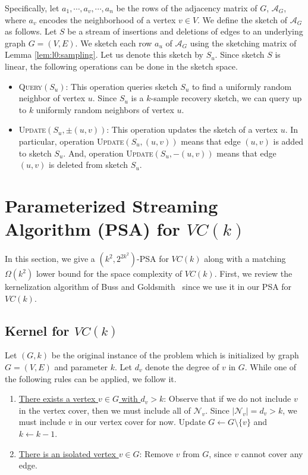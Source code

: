 \documentclass[11pt,letter]{article}
\begin{document}
Specifically,
let $a_1,\cdots,a_v,\cdots,a_n$ be the rows of the adjacency matrix of
$G$, $\mathcal{A}_G$, where
$a_v$ encodes the neighborhood of a vertex $v\in V$. We define the sketch of $\mathcal{A}_G$ as follows.
Let $S$ be a stream of insertions and deletions of edges to an underlying graph $G=(V,E)$.
We sketch each row $a_u$ of $\mathcal{A}_G$ using the sketching matrix of
Lemma \ref{lem:l0:sampling}. Let us denote this sketch by $S_{u}$.
Since sketch $S$ is linear, the following operations can be done in the sketch space.

\begin{itemize}
\item \textsc{Query}$(S_u)$:  This operation queries sketch $S_u$ to
find a uniformly random neighbor of vertex $u$. Since $S_u$ is a $k$-sample
recovery sketch, we can query up to $k$ uniformly random neighbors of vertex $u$.
\item \textsc{Update}$(S_u, \pm(u,v))$:
This operation updates the sketch of a vertex $u$.
In particular, operation \textsc{Update}$(S_u, (u,v))$
means that edge $(u,v)$ is added to  sketch $S_u$.
And, operation \textsc{Update}$(S_u, -(u,v))$
means that edge $(u,v)$ is deleted from  sketch $S_u$.
\end{itemize}




\section{Parameterized Streaming Algorithm (PSA) for $VC(k)$}
\label{sec:psa:vc}

In this section, we give a $(k^2, 2^{2k^2})$-PSA for $VC(k)$ along with a matching $\Omega(k^2)$ lower bound for the space complexity of $VC(k)$. First, we review the kernelization algorithm of Buss and Goldsmith~\cite{BG93}
since we use it in our PSA for $VC(k)$.

\subsection{Kernel for $VC(k)$}
\label{sec:kernel:VC}
Let $(G,k)$ be the original instance of the problem which is initialized by graph
$G=(V, E)$ and parameter $k$. Let $d_v$ denote the degree of $v$ in $G$.
While one of the following rules can be applied, we follow it.


\begin{enumerate}
 \item \underline{There exists a vertex $v\in G$ with $d_v > k$}: Observe that if we do not include $v$ in the vertex cover, then we must include all of $\mathcal{N}_{v}$. Since $|\mathcal{N}_v|=d_v >k$, we must include $v$ in our vertex cover for now. Update $G\leftarrow G\setminus \{v\}$ and $k\leftarrow k-1$.

\item \underline{There is an isolated vertex $v\in G$}: Remove $v$ from $G$, since
 $v$ cannot cover any edge.


\end{enumerate}
\end{document}
